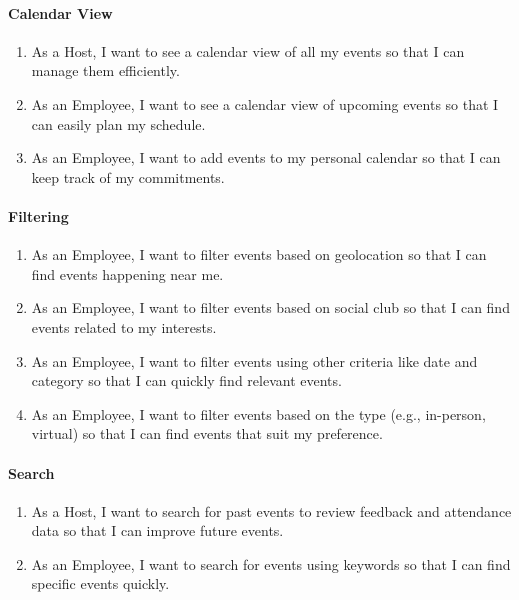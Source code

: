 \documentclass[a4paper,12pt]{article}
\begin{document}
\paragraph{Calendar View}

\begin{enumerate}
    \item As a Host, I want to see a calendar view of all my events so that I can manage them efficiently.
    \item As an Employee, I want to see a calendar view of upcoming events so that I can easily plan my schedule.
    \item As an Employee, I want to add events to my personal calendar so that I can keep track of my commitments.
\end{enumerate}

\paragraph{Filtering}

\begin{enumerate}
    \item As an Employee, I want to filter events based on geolocation so that I can find events happening near me.
    \item As an Employee, I want to filter events based on social club so that I can find events related to my interests.
    \item As an Employee, I want to filter events using other criteria like date and category so that I can quickly 
    find relevant events.
    \item As an Employee, I want to filter events based on the type (e.g., in-person, virtual) so that I can find 
    events that suit my preference.
\end{enumerate}

\paragraph{Search}

\begin{enumerate}
    \item As a Host, I want to search for past events to review feedback and attendance data so that I can improve future events.
    \item As an Employee, I want to search for events using keywords so that I can find specific events quickly.
\end{enumerate}
\end{document}
